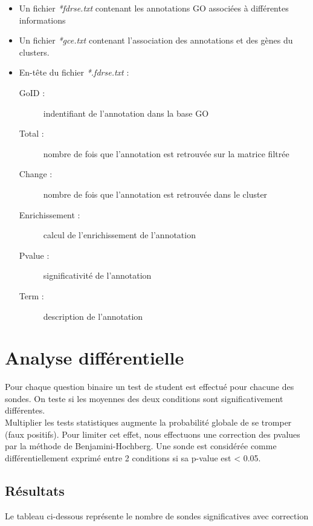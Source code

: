 \documentclass[a4paper]{article}
\begin{document}
\begin{itemize}
	\item Un fichier \emph{*fdrse.txt} contenant les annotations GO associées à différentes informations
	\item Un fichier \emph{*gce.txt} contenant l'association des annotations et des gènes du clusters.
\end{itemize}
\begin{itemize}
\item En-tête du fichier \emph{*.fdrse.txt} :
\begin{description}
	\item[GoID : ] indentifiant de l'annotation dans la base GO 
	\item[Total : ] nombre de fois que l'annotation est retrouvée sur la matrice filtrée
	\item[Change : ] nombre de fois que l'annotation est retrouvée dans le cluster
	\item[Enrichissement : ] calcul de l'enrichissement de l'annotation
	\item[Pvalue : ] significativité de l'annotation
	\item[Term : ] description de l'annotation
\end{description}

\end{itemize}


\section{Analyse différentielle}
\label{sec:gendiff}
Pour chaque question binaire un test de student est effectué pour chacune des sondes. On teste si les moyennes des deux conditions sont significativement différentes.
\\
Multiplier les tests statistiques augmente la probabilité globale de se tromper (faux positifs). Pour limiter cet effet, nous effectuons une correction des pvalues par la méthode de Benjamini-Hochberg. Une sonde est considérée comme différentiellement exprimé entre 2 conditions si sa p-value est < 0.05.
\\

\subsection{Résultats}

Le tableau ci-dessous représente le nombre de sondes significatives avec correction
\par

\end{document}
